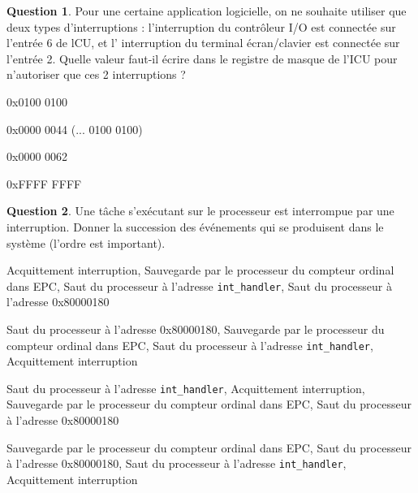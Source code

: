 \documentclass[11pt,english,french]{scrreprt}
\theoremstyle{remark}
\theoremstyle{definition}
\newtheorem{ques}{Question}[section]
\begin{document}
\begin{ques}
	Pour une certaine application logicielle, on ne souhaite utiliser que deux types d'interruptions : l'interruption du contrôleur I/O est connectée sur l'entrée 6 de lCU, et l' interruption du terminal écran/clavier est connectée sur l'entrée 2. Quelle valeur faut-il écrire dans le registre de masque de l'ICU pour n'autoriser que ces 2 interruptions ?
\begin{description}
	\setlength{\itemsep}{2pt}
	\setlength{\parskip}{-1pt}
	\setlength{\parsep}{-1pt}
	\item[\Square] 0x0100 0100
	\item[\CheckedBox] 0x0000 0044 (... 0100 0100)
	\item[\Square] 0x0000 0062
	\item[\Square] 0xFFFF FFFF
\end{description}
\end{ques}

\begin{ques}
	Une tâche s'exécutant sur le processeur est interrompue par une interruption. Donner la succession des événements qui se produisent dans le système (l'ordre est important).
\begin{description}
	\setlength{\itemsep}{2pt}
	\setlength{\parskip}{-1pt}
	\setlength{\parsep}{-1pt}
	\item[\Square] Acquittement interruption, Sauvegarde par le processeur du compteur ordinal dans EPC, Saut du processeur à l'adresse \lstinline!int_handler!, Saut du processeur à l'adresse 0x80000180
	\item[\Square] Saut du processeur à l'adresse 0x80000180, Sauvegarde par le processeur du compteur ordinal dans EPC, Saut du processeur à l'adresse \lstinline!int_handler!, Acquittement interruption
	\item[\Square] Saut du processeur à l'adresse \lstinline!int_handler!, Acquittement interruption, Sauvegarde par le processeur du compteur ordinal dans EPC, Saut du processeur à l'adresse 0x80000180
	\item[\CheckedBox] Sauvegarde par le processeur du compteur ordinal dans EPC, Saut du processeur à l'adresse 0x80000180, Saut du processeur à l'adresse \lstinline!int_handler!, Acquittement interruption
\end{description}
\end{ques}
\end{document}
